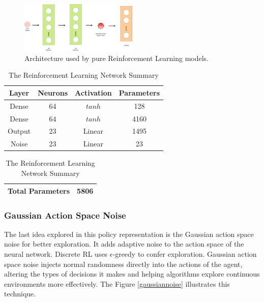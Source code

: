 \begin{figure}[!htbp]
	\centering
	\includegraphics[width=0.5\textwidth]{Cap5/rlnetwork.eps}
	\caption{Architecture used by pure Reinforcement Learning models.}
	\label{rlnetwork}
\end{figure}

\begin{table}[htbp]
	\caption{The Reinforcement Learning Network Summary}
	\begin{center}
		\begin{tabular}{|c|c|c|c|}
			\hline
			\textbf{Layer}&{\textbf{Neurons}}& \textbf{Activation}& \textbf{Parameters} \\
			\hline
			Dense & 64 & $tanh$ & 128  \\
			\hline
			Dense & 64 & $tanh$ & 4160 \\
			\hline
			Output & 23 & Linear & 1495 \\
			\hline
			Noise & 23 & Linear & 23 \\
			\hline
		\end{tabular}
		\begin{tabular}{|c|c|}
			\hline
			\textbf{Total Parameters} & 5806 \\
			\hline
		\end{tabular}
		\label{tab:rl_network_summary}
	\end{center}
\end{table}


\subsubsection{Gaussian Action Space Noise}\label{gasp}

The last idea explored in this policy representation is the Gaussian action space noise for better exploration. It adds adaptive noise to the action space of the neural network. Discrete RL uses $\epsilon$-greedy \cite{Watkins:1989} to confer exploration. Gaussian action space noise injects normal randomness directly into the actions of the agent, altering the types of decisions it makes and helping algorithms explore continuous environments more effectively. The Figure \ref{gaussiannoise} illustrates this technique.


